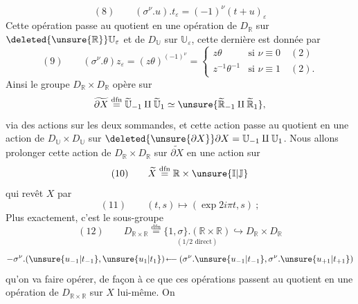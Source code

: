 \[
(8)\qquad (\sigma^\nu.u).t_\varepsilon=(-1)^\nu(t+u)_\varepsilon
\]
Cette opération passe au quotient en une opération de $D_{\mathbb R}$ sur $\deleted{\unsure{\mathbb R}}\mathbb U_\varepsilon$ et  de $D_{\mathbb U}$ sur $\mathbb U_\varepsilon$, cette dernière est donnée par
\[
(9)\qquad (\sigma^\nu.\theta)z_\varepsilon=(z\theta)^{(-1)^\nu}=\left\{\begin{array}{ll}
z\theta&\text{si }\nu\equiv0\quad(2)\\
z^{-1}\theta^{-1}&\text{si }\nu\equiv1\quad(2).
\end{array}\right.
\]
Ainsi le groupe $D_{\mathbb R}\times D_{\mathbb R}$ opère sur
\[
\widetilde{\partial X}\overset{\mathrm{dfn}}{=}\widetilde{\mathbb U}_{-1}\amalg\widetilde{\mathbb U}_1\simeq\unsure{\widetilde{\mathbb R}_{-1}\amalg\widetilde{\mathbb R}_1},
\]
via des actions sur les deux sommandes, et cette action passe au quotient en une action de $D_{\mathbb U}\times D_{\mathbb U}$ sur $\deleted{\unsure{\partial X}}\partial X=\mathbb U_{-1}\amalg\mathbb U_1$. Nous allons prolonger cette action de $D_{\mathbb R}\times D_{\mathbb R}$ sur $\widetilde{\partial X}$ en une action sur
\[
(10)\qquad \widetilde X\overset{\mathrm{dfn}}{=}\mathbb R\times\unsure{\mathbb I|\mathbb J}
\]
qui revêt $X$ par
\[
(11)\qquad (t,s)\longmapsto(\exp2i\pi t,s)\ ;
\]
 Plus exactement, c'est le sous-groupe
\[
(12)\qquad D_{\mathbb R\times\mathbb R}\overset{\mathrm{dfn}}{=}\underset{(1/2\text{ direct})}{\{1,\sigma\}.(\mathbb R\times\mathbb R)}\hookrightarrow D_{\mathbb R}\times D_{\mathbb R}
\]
\[
-\sigma^\nu.(\unsure{u_{-1}|t_{-1}},\unsure{u_1|t_1})\mathbin{\mapstochar\!\relbar\!\relbar}(\sigma^\nu.\unsure{u_{-1}|t_{-1}},\sigma^\nu.\unsure{u_{+1}|t_{+1}})
\]
qu'on va faire opérer, de façon à ce que ces opérations passent au quotient en une opération de $D_{\mathbb R\times\mathbb R}$ sur $X$ lui-même. On



